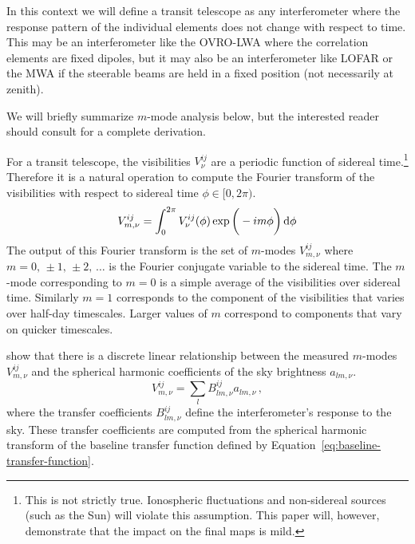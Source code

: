 \documentclass[twocolumn]{aastex61}
\renewcommand{\d}{{\rm d}}
\begin{document}
In this context we will define a transit telescope as any interferometer where the response pattern
of the individual elements does not change with respect to time. This may be an interferometer like
the OVRO-LWA where the correlation elements are fixed dipoles, but it may also be an interferometer
like LOFAR or the MWA if the steerable beams are held in a fixed position (not necessarily at
zenith).

We will briefly summarize $m$-mode analysis below, but the interested reader should consult
\citet{2014ApJ...781...57S, 2015PhRvD..91h3514S} for a complete derivation.

For a transit telescope, the visibilities $V^{ij}_\nu$ are a periodic function of sidereal
time.\footnote{
    This is not strictly true. Ionospheric fluctuations and non-sidereal sources (such as the Sun)
    will violate this assumption. This paper will, however, demonstrate that the impact on the final
    maps is mild.
}
Therefore it is a natural operation to compute the Fourier transform of the visibilities with
respect to sidereal time $\phi\in[0,2\pi)$.
\begin{equation}
    V^{ij}_{m,\nu} = \int_0^{2\pi} V^{ij}_\nu(\phi)\exp\bigg(-im\phi\bigg)\,\d\phi
\end{equation}
The output of this Fourier transform is the set of $m$-modes $V^{ij}_{m,\nu}$ where
$m=0,\,\pm1,\,\pm2,\,\ldots$ is the Fourier conjugate variable to the sidereal time. The $m$-mode
corresponding to $m=0$ is a simple average of the visibilities over sidereal time. Similarly $m=1$
corresponds to the component of the visibilities that varies over half-day timescales. Larger values
of $m$ correspond to components that vary on quicker timescales.

\citet{2014ApJ...781...57S, 2015PhRvD..91h3514S} show that there is a discrete linear relationship
between the measured $m$-modes $V^{ij}_{m,\nu}$ and the spherical harmonic coefficients of the sky
brightness $a_{lm,\nu}$.
\begin{equation}\label{eq:m-mode-sum-equation}
    V^{ij}_{m,\nu} = \sum_l B^{ij}_{lm,\nu} a_{lm,\nu}\,,
\end{equation}
where the transfer coefficients $B^{ij}_{lm,\nu}$ define the interferometer's response to the sky.
These transfer coefficients are computed from the spherical harmonic transform of the baseline
transfer function defined by Equation~\ref{eq:baseline-transfer-function}.
\end{document}
